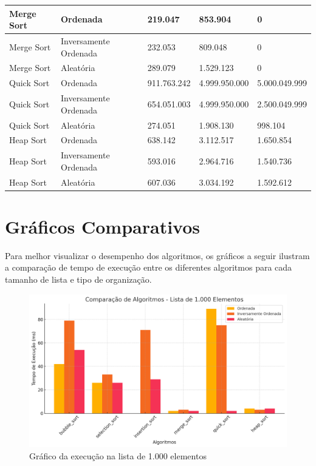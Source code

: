 \documentclass[tcc2]{uftex}
\begin{document}
\begin{table}[h]
\begin{tabular}{|l|l|l|l|l|}
Merge Sort           & Ordenada                     & 219.047             & 853.904              & 0              \\ \hline
Merge Sort           & Inversamente Ordenada        & 232.053             & 809.048              & 0              \\ \hline
Merge Sort           & Aleatória                    & 289.079             & 1.529.123            & 0              \\ \hline
Quick Sort           & Ordenada                     & 911.763.242         & 4.999.950.000        & 5.000.049.999  \\ \hline
Quick Sort           & Inversamente Ordenada        & 654.051.003         & 4.999.950.000        & 2.500.049.999  \\ \hline
Quick Sort           & Aleatória                    & 274.051             & 1.908.130            & 998.104        \\ \hline
Heap Sort            & Ordenada                     & 638.142             & 3.112.517            & 1.650.854      \\ \hline
Heap Sort            & Inversamente Ordenada        & 593.016             & 2.964.716            & 1.540.736      \\ \hline
Heap Sort            & Aleatória                    & 607.036             & 3.034.192            & 1.592.612      \\ \hline
\end{tabular}
\end{table}

\section{Gráficos Comparativos}
Para melhor visualizar o desempenho dos algoritmos, os gráficos a seguir ilustram a comparação de tempo de execução entre os diferentes algoritmos para cada tamanho de lista e tipo de organização.

\begin{figure}[!h]
    \centering
    \includegraphics[width=0.8\linewidth]{trabalho/1.000 elementos.png}
    \caption{Gráfico da execução na lista de 1.000 elementos}
    \label{fig:enter-label}
\end{figure}
\end{document}
